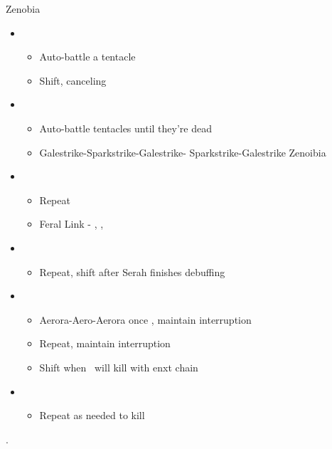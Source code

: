 \begin{battle}{Zenobia}
	\begin{flushleft}
		\begin{itemize}
			\item \sixth
			      \begin{itemize}
				      \item Auto-battle a tentacle
				      \item Shift, canceling \chu
			      \end{itemize}
			\item \fifth
			      \begin{itemize}
				      \item Auto-battle tentacles until they're dead
				      \item Galestrike-Sparkstrike-Galestrike- Sparkstrike-Galestrike Zenoibia
			      \end{itemize}
			\item \second
			      \begin{itemize}
				      \item Repeat
				      \item Feral Link - \circlec, \squarec, \circlec
			      \end{itemize}
			\item \third
			      \begin{itemize}
				      \item Repeat, shift after Serah finishes debuffing
			      \end{itemize}
			\item \fifth
			      \begin{itemize}
				      \item Aerora-Aero-Aerora once \stagger, maintain interruption
				      \item Repeat, maintain interruption
				      \item Shift when \chu\ will kill with enxt chain
			      \end{itemize}
			\item \sixth
			      \begin{itemize}
				      \item Repeat as needed to kill
			      \end{itemize}
		\end{itemize}
	\end{flushleft}
\end{battle}

 .
\newline